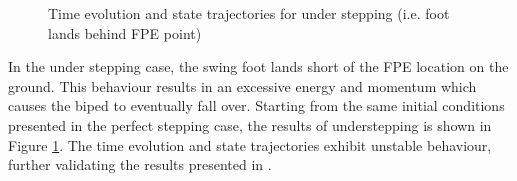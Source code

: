\begin{figure}[!h]
	\begin{center}
	\end{center}
  	\caption{Time evolution and state trajectories for under stepping (i.e. foot lands behind FPE point)}
	\label{sim:under}
\end{figure}

In the under stepping case, the swing foot lands short of the FPE location on the ground. This behaviour results in an excessive energy and momentum which causes the biped to eventually fall over. Starting from the same initial conditions presented in the perfect stepping case, the results of understepping is shown in Figure \ref{sim:under}. The time evolution and state trajectories exhibit unstable behaviour, further validating the results presented in \cite{Wight:2008ii}. 

